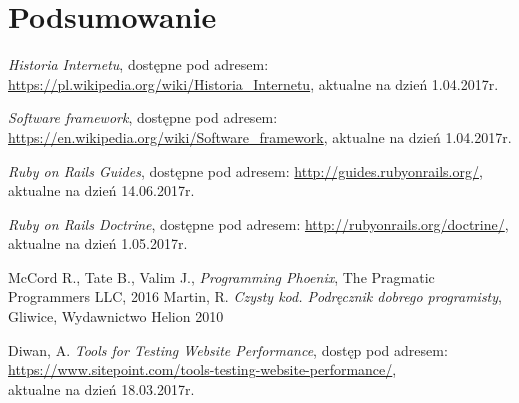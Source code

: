 \documentclass[mgr,oneside]{mgr}
\begin{document}
\chapter{Podsumowanie}
\renewcommand\bibname{Literatura}
\begin{thebibliography}{inteligencja}

  \emph{Historia Internetu}, dostępne pod adresem: \url{https://pl.wikipedia.org/wiki/Historia_Internetu}, aktualne na dzień 1.04.2017r.

  \emph{Software framework}, dostępne pod adresem: \url{https://en.wikipedia.org/wiki/Software_framework}, aktualne na dzień 1.04.2017r.

	\emph{Ruby on Rails Guides}, dostępne pod adresem: \url{http://guides.rubyonrails.org/},\\ aktualne na dzień 14.06.2017r.

  \emph{Ruby on Rails Doctrine}, dostępne pod adresem: \url{http://rubyonrails.org/doctrine/}, aktualne na dzień 1.05.2017r.

  McCord R., Tate B., Valim J., \emph{Programming Phoenix}, The Pragmatic Programmers LLC, 2016
	Martin, R. \emph{Czysty kod. Podręcznik dobrego programisty}, Gliwice, Wydawnictwo Helion 2010

  Diwan, A. \emph{Tools for Testing Website Performance}, dostęp pod adresem: \url{https://www.sitepoint.com/tools-testing-website-performance/}, \\ aktualne na dzień 18.03.2017r.

\end{thebibliography}
\end{document}
